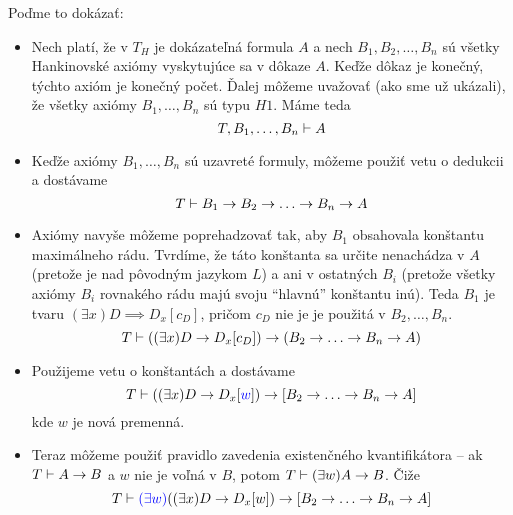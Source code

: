\begin{dokaz}
    \medskip
    Poďme to dokázať:
    \begin{itemize}
    \item
        Nech platí, že v $T_H$ je dokázateľná formula $A$
        a nech $B_1, B_2, \dots, B_n$ sú všetky Hankinovské
        axiómy vyskytujúce sa v dôkaze $A$. Keďže dôkaz je konečný, týchto
        axióm je konečný počet. Ďalej môžeme uvažovať (ako sme už ukázali),
        že všetky axiómy $B_1, \ldots, B_n$ sú typu $H1$.
        Máme teda
        \begin{equation*}
            T, B_1, \dots ,B_n \vdash A
        \end{equation*}

    \item
    Keďže axiómy $B_1,\ldots,B_n$ sú uzavreté formuly,
    môžeme použiť vetu o dedukcii a dostávame
    \begin{equation*}
        T \vdash B_1 \rightarrow B_2 \rightarrow \ldots \rightarrow B_n \rightarrow A
    \end{equation*}

    \item
    Axiómy navyše môžeme poprehadzovať tak,
    aby $B_1$ obsahovala konštantu maximálneho rádu.
    Tvrdíme, že táto konštanta sa určite nenachádza v $A$ (pretože je
    nad pôvodným jazykom $L$)
    a ani v ostatných $B_i$
    (pretože všetky axiómy $B_i$ rovnakého rádu majú svoju
    ``hlavnú'' konštantu inú).
    Teda $B_1$ je tvaru $(\exists x) D \implies D_x[c_D]$,
    pričom $c_D$ nie je je použitá
    v $B_2, \ldots, B_n$. 
    \begin{equation*}
        T \vdash ((\exists x) D \rightarrow D_x[c_D] ) \rightarrow 
            (B_2 \rightarrow \ldots \rightarrow B_n \rightarrow A)
    \end{equation*}

    \item
    Použijeme vetu o konštantách a dostávame
    \begin{equation*}
        T \vdash ((\exists x) D \rightarrow D_x[{\color{blue}w}] ) \rightarrow 
            [B_2 \rightarrow \ldots \rightarrow B_n \rightarrow A]
    \end{equation*}
    kde $w$ je nová premenná.
    \item
    Teraz môžeme použiť pravidlo zavedenia existenčného kvantifikátora --
    ak $T \vdash A \rightarrow B$ a $w$ nie je voľná v $B$, potom $T\vdash (\exists w) A \rightarrow B$.
    Čiže
    \begin{equation*}
        T \vdash {\color{blue}(\exists w)} ((\exists x)D \rightarrow D_x[w]) 
            \rightarrow [B_2 \rightarrow \ldots \rightarrow B_n \rightarrow A]
    \end{equation*}


\end{itemize}
\end{dokaz}
